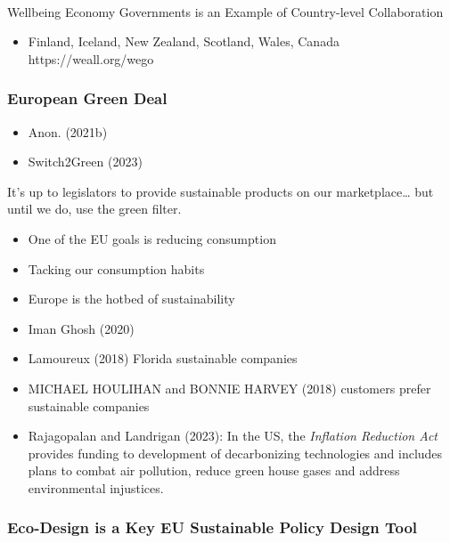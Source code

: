 \documentclass[
  letterpaper,
  DIV=11,
  numbers=noendperiod]{scrartcl}
\makeatletter
\let\oldparagraph\paragraph
\renewcommand{\paragraph}{
    \@ifstar
      \xxxParagraphStar
      \xxxParagraphNoStar
  }
\newcommand{\xxxParagraphStar}[1]{\oldparagraph*{#1}\mbox{}}
\newcommand{\xxxParagraphNoStar}[1]{\oldparagraph{#1}\mbox{}}
\providecommand{\tightlist}{%
  \setlength{\itemsep}{0pt}\setlength{\parskip}{0pt}}\usepackage{longtable,booktabs,array}
\makeatother
\begin{document}
\paragraph{Wellbeing Economy Governments is an Example of Country-level
Collaboration}\label{wellbeing-economy-governments-is-an-example-of-country-level-collaboration}

\begin{itemize}
\tightlist
\item
  Finland, Iceland, New Zealand, Scotland, Wales, Canada
  https://weall.org/wego
\end{itemize}

\subsubsection{European Green Deal}\label{european-green-deal}

\begin{itemize}
\tightlist
\item
  Anon. (2021b)
\item
  Switch2Green (2023)
\end{itemize}

It's up to legislators to provide sustainable products on our
marketplace\ldots{} but until we do, use the green filter.

\begin{itemize}
\tightlist
\item
  One of the EU goals is reducing consumption
\item
  Tacking our consumption habits
\item
  Europe is the hotbed of sustainability
\item
  Iman Ghosh (2020)
\item
  Lamoureux (2018) Florida sustainable companies
\item
  MICHAEL HOULIHAN and BONNIE HARVEY (2018) customers prefer sustainable
  companies
\item
  Rajagopalan and Landrigan (2023): In the US, the \emph{Inflation
  Reduction Act} provides funding to development of decarbonizing
  technologies and includes plans to combat air pollution, reduce green
  house gases and address environmental injustices.
\end{itemize}

\subsubsection{Eco-Design is a Key EU Sustainable Policy Design
Tool}\label{eco-design-is-a-key-eu-sustainable-policy-design-tool}
\end{document}
